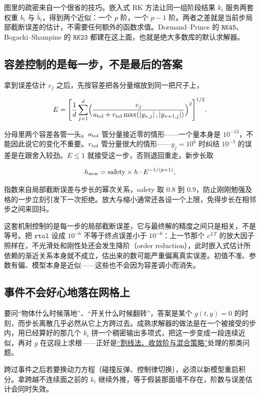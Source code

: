 图里的疏密来自一个很省的技巧。嵌入式 RK 方法让同一组阶段结果 \(k_i\) 服务两套权重 \(b_i\) 与 \(\hat b_i\)，得到两个近似：一个 \(p\) 阶，一个 \(p-1\) 阶。两者之差就是当前步局部截断误差的估计，不需要任何额外的函数求值。Dormand--Prince 的 \(\texttt{RK45}\)、Bogacki--Shampine 的 \(\texttt{RK23}\) 都建在这上面，也就是绝大多数库的默认求解器。

\subsection{容差控制的是每一步，不是最后的答案}

拿到误差估计 \(e_j\) 之后，先按容差把各分量缩放到同一把尺子上，

\[
E=\Biggl[\frac1d\sum_{j=1}^{d}\Bigl(\frac{e_j}{a_{\rm tol}+r_{\rm tol}\max(\left|y_{n,j}\right|,\left|y_{n+1,j}\right|)}\Bigr)^{2}\Biggr]^{1/2}.
\]

分母里两个容差各管一头。\(a_{\rm tol}\) 管分量接近零的情形——一个量本身是 \(10^{-13}\)，不能因此说它的变化不重要。\(r_{\rm tol}\) 管分量很大的情形——\(y_j=10^{6}\) 时纠结 \(10^{-3}\) 的误差是在跟舍入较劲。\(E\le1\) 就接受这一步，否则退回重走，新步长取

\[
h_{\rm new}=\text{safety}\times h\cdot E^{-1/(p+1)},
\]

指数来自局部截断误差与步长的幂次关系，safety 取 \(0.8\) 到 \(0.9\)，防止刚刚勉强及格的一步立刻引发下一次拒绝。放大与缩小通常还各设一个上限，免得步长在相邻步之间来回抖。

这套机制控制的是每一步的局部截断误差，它与最终解的精度之间只是相关，不是等号。把 \(\texttt{rtol}\) 设成 \(10^{-6}\) 不等于终点误差小于 \(10^{-6}\)：上一节那个 \(e^{LT}\) 的放大因子照样在，不光滑处和刚性处还会发生降阶（order reduction），此时嵌入式估计所依赖的渐近关系本身就不成立，估出来的数可能严重偏离真实误差。初值不准、参数有偏、模型本身是近似——这些也不会因为容差调小而消失。

\subsection{事件不会好心地落在网格上}

要问``物体什么时候落地''、``开关什么时候翻转''，答案是某个 \(g(t,y)=0\) 的时刻，而步长离散几乎必然从它上方跨过去。成熟求解器的做法是在一个被接受的步内，用已经算好的那几个 \(k_i\) 拼一个稠密输出多项式，把这一步变成一段连续近似，再对 \(g\) 在这段上求根——正好是\hyperref[sec:08-Numerical-Analysis/02-Root-Finding/03]{``割线法、收敛阶与混合策略''}处理的那类问题。

跨过事件之后若要换动力方程（碰撞反弹、控制律切换），必须以新模型重启积分。拿跨越不连续面之前的 \(k_i\) 继续外推，等于假装那面墙不存在，阶数与误差估计会同时失效。

